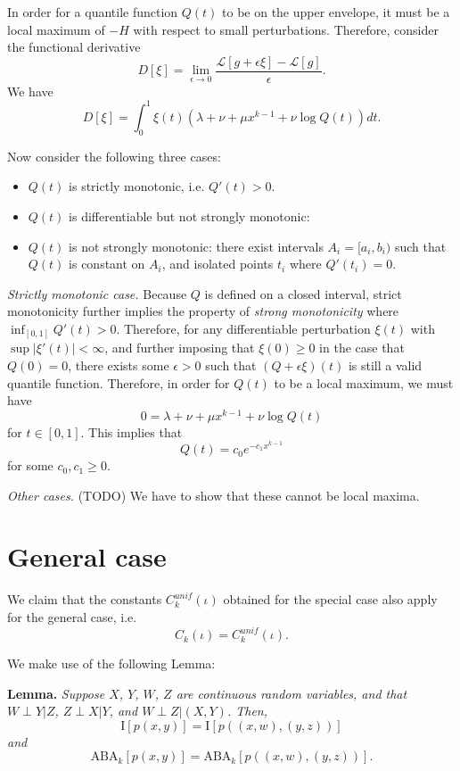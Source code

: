\documentclass[12pt]{article}
\begin{document}
In order for a quantile function $Q(t)$ to be on the upper envelope, it must be a local maximum of $-H$ with respect to small perturbations.  Therefore, consider the functional derivative
\[
D[\xi] = \lim_{\epsilon \to 0} \frac{\mathcal{L}[g + \epsilon \xi] - \mathcal{L}[g]}{\epsilon}.
\]
We have
\[
D[\xi] = \int_0^1 \xi(t) (\lambda + \nu  + \mu x^{k-1} + \nu \log Q(t)) dt.
\]

Now consider the following three cases:
\begin{itemize}
\item $Q(t)$ is strictly monotonic, i.e. $Q'(t) > 0.$
\item $Q(t)$ is differentiable but not strongly monotonic: 
\item $Q(t)$ is not strongly monotonic: there exist intervals $A_i = [a_i, b_i)$ such that $Q(t)$ is constant on $A_i$,
and isolated points $t_i$ where $Q'(t_i) = 0.$
\end{itemize}

\emph{Strictly monotonic case.}  Because $Q$ is defined on a closed interval,
strict monotonicity further implies the property of \emph{strong monotonicity} where 
$\inf_[0,1] Q'(t) > 0.$  Therefore, for any differentiable perturbation $\xi(t)$ with $\sup |\xi'(t)| <\infty$,
and further imposing that $\xi(0) \geq 0$ in the case that $Q(0) = 0$,
there exists some $\epsilon >0$ such that $(Q + \epsilon \xi)(t)$ is still a valid quantile function.
Therefore, in order for $Q(t)$ to be a local maximum, we must have
\[
0 = \lambda + \nu  + \mu x^{k-1} + \nu \log Q(t)
\]
for $t \in [0,1]$.  This implies that
\[
Q(t) = c_0 e^{-c_1 x^{k-1}}
\]
for some $c_0, c_1 \geq 0$.

\emph{Other cases.}   (TODO) We have to show that these cannot be local maxima.



\section{General case}

We claim that the constants $C_k^{unif}(\iota)$ obtained for the special case also apply for the general case, i.e.
\[
C_k(\iota) = C_k^{unif}(\iota).
\]

We make use of the following Lemma:

\textbf{Lemma.} \emph{
Suppose $X$, $Y$, $W$, $Z$ are continuous random variables, and that $W\perp Y|Z$, $Z \perp X|Y$, and $W \perp Z|(X,Y)$.
Then,
\[
\text{I}[p(x, y)] = \text{I}[p((x,w), (y,z))]
\]
and
\[
\text{ABA}_k[p(x, y)] = \text{ABA}_k[p((x,w), (y,z))].
\]
}
\end{document}
